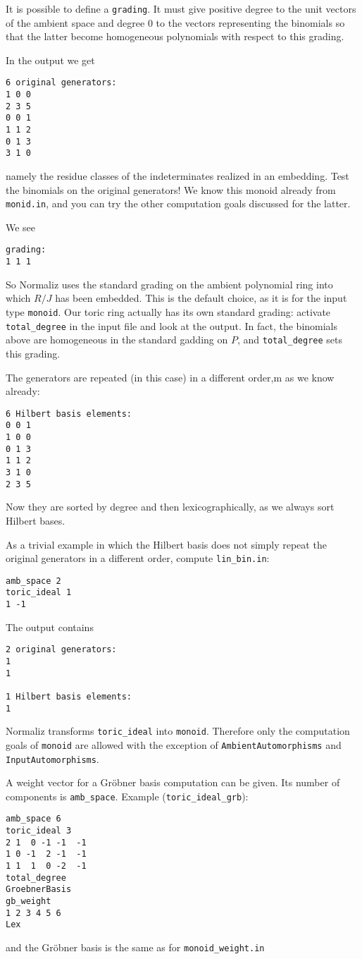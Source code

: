 It is possible to define a \verb|grading|. It must give positive degree to the unit vectors of the ambient space and degree $0$ to the vectors representing the binomials so that the latter become homogeneous polynomials with respect to this grading.

In the output we get
\begin{Verbatim}
6 original generators:
1 0 0
2 3 5
0 0 1
1 1 2
0 1 3
3 1 0
\end{Verbatim}
namely the residue classes of the indeterminates realized in an embedding. Test the binomials on the original generators! We know this monoid already from \verb|monid.in|, and you can try the other computation goals discussed for the latter.

We see
\begin{Verbatim}
grading:
1 1 1 
\end{Verbatim}
So Normaliz uses the standard grading on the ambient polynomial ring into which $R/J$ has been embedded. This is the default choice, as it is for the input type \verb|monoid|. Our toric ring actually has its own standard grading: activate \verb|total_degree| in the input file and look at the output. In fact, the binomials above are homogeneous in the standard gadding on $P$, and \verb|total_degree| sets this grading.

The generators are repeated (in this case) in a different order,m as we know already:
\begin{Verbatim}
6 Hilbert basis elements:
0 0 1
1 0 0
0 1 3
1 1 2
3 1 0
2 3 5
\end{Verbatim}
Now they are sorted by degree and then lexicographically, as we always sort Hilbert bases.

As a trivial example in which the Hilbert basis does not simply repeat the original generators in a different order, compute \verb|lin_bin.in|:
\begin{Verbatim}
amb_space 2
toric_ideal 1
1 -1
\end{Verbatim}
The output contains
\begin{Verbatim}
2 original generators:
1
1

1 Hilbert basis elements:
1
\end{Verbatim}

Normaliz transforms \verb|toric_ideal| into \verb|monoid|. Therefore only the computation goals of \verb|monoid| are allowed with the exception of \verb|AmbientAutomorphisms| and \verb|InputAutomorphisms|.

A weight vector for a Gröbner basis computation can be given. Its number of components is \verb|amb_space|. Example (\verb|toric_ideal_grb|):
\begin{Verbatim}
amb_space 6
toric_ideal 3
2 1  0 -1 -1  -1
1 0 -1  2 -1  -1
1 1  1  0 -2  -1
total_degree
GroebnerBasis
gb_weight
1 2 3 4 5 6
Lex
\end{Verbatim}
and the Gröbner basis is the same as for \verb|monoid_weight.in|

